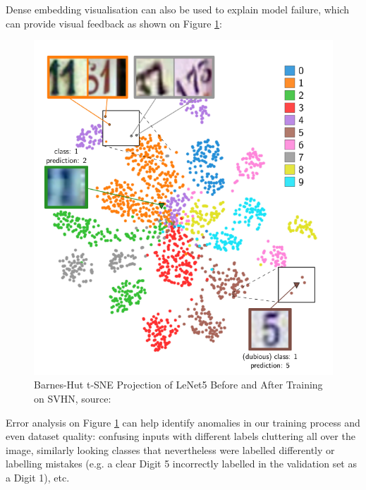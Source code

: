 \vspace{0.2cm}

Dense embedding visualisation can also be used to explain model failure, which can provide visual feedback as shown on Figure \ref{fig:HRV_005_Rauber_A}:

\vspace{0.2cm}

\begin{figure}[H]
	\centering
	\includegraphics[scale=0.65]{images/embedding_view/HRV_Fig_005_Rauber_A.PNG}
	\caption{Barnes-Hut t-SNE Projection of LeNet5 Before and After Training on SVHN, source: \cite{Rauber2017VisualizingTH}}
	\label{fig:HRV_005_Rauber_A}
\end{figure}

\vspace{0.2cm}

Error analysis on Figure \ref{fig:HRV_005_Rauber_A} can help identify anomalies in our training process and even dataset quality: confusing inputs with different labels cluttering all over the image, similarly looking classes that nevertheless were labelled differently or labelling mistakes (e.g. a clear Digit 5 incorrectly labelled in the validation set as a Digit 1), etc.

